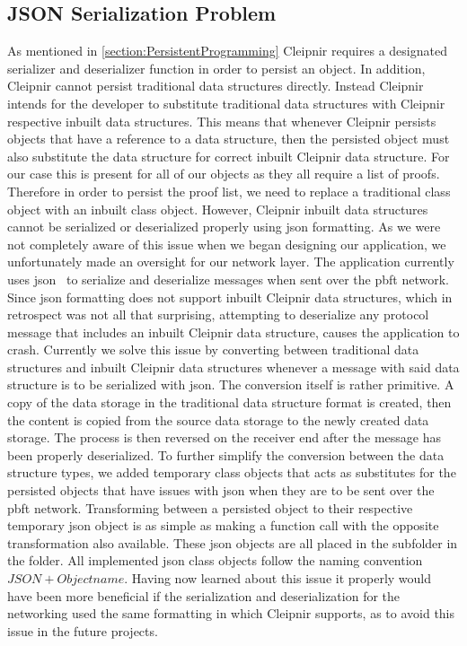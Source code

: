 \subsection{JSON Serialization Problem}
As mentioned in \autoref{section:PersistentProgramming} Cleipnir requires a designated serializer and deserializer function in order to persist an object. In addition, Cleipnir cannot persist traditional data structures directly. Instead Cleipnir intends for the developer to substitute traditional data structures with Cleipnir respective inbuilt data structures. This means that whenever Cleipnir persists objects that have a reference to a data structure, then the persisted object must also substitute the data structure for correct inbuilt Cleipnir data structure. For our case this is present for all of our  objects as they all require a list of proofs. Therefore in order to persist the proof list, we need to replace a traditional  class object with an inbuilt  class object. However, Cleipnir inbuilt data structures cannot be serialized or deserialized properly using \ac{json} formatting. As we were not completely aware of this issue when we began designing our application, we unfortunately made an oversight for our network layer. The application currently uses \ac{json}~\cite{WEB:NewJSON} to serialize and deserialize messages when sent over the \ac{pbft} network. Since \ac{json} formatting does not support inbuilt Cleipnir data structures, which in retrospect was not all that surprising, attempting to deserialize any protocol message that includes an inbuilt Cleipnir data structure, causes the application to crash. Currently we solve this issue by converting between traditional data structures and inbuilt Cleipnir data structures whenever a message with said data structure is to be serialized with \ac{json}. The conversion itself is rather primitive. A copy of the data storage in the traditional data structure format is created, then the content is copied from the source data storage to the newly created data storage. The process is then reversed on the receiver end after the message has been properly deserialized. To further simplify the conversion between the data structure types, we added temporary  class objects that acts as substitutes for the persisted objects that have issues with \ac{json} when they are to be sent over the \ac{pbft} network. Transforming between a persisted object to their respective temporary \ac{json} object is as simple as making a function call with the opposite transformation also available. These \ac{json} objects are all placed in the subfolder  in the  folder. All implemented \ac{json} class objects follow the naming convention $JSON + Objectname$. Having now learned about this issue it properly would have been more beneficial if the serialization and deserialization for the networking used the same formatting in which Cleipnir supports, as to avoid this issue in the future projects.

